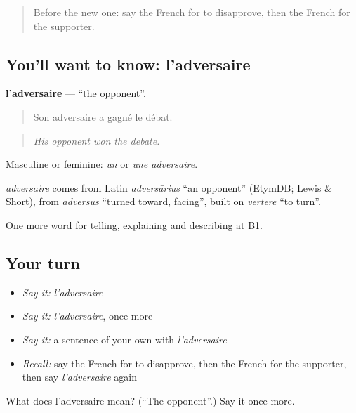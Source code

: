 \begin{quote}
Before the new one: say the French for to disapprove, then the French for the supporter.
\end{quote}

\subsection*{You'll want to know: l'adversaire}
\textbf{l'adversaire} — \textquotedblleft{}the opponent\textquotedblright{}.

\begin{quote}
Son adversaire a gagné le débat.
\end{quote}

\begin{quote}
\emph{His opponent won the debate.}
\end{quote}

Masculine or feminine: \emph{un} or \emph{une adversaire}.

\begin{cousinweb}
\emph{adversaire} comes from Latin \emph{adversārius} \textquotedblleft{}an opponent\textquotedblright{} (EtymDB; Lewis \& Short), from \emph{adversus} \textquotedblleft{}turned toward, facing\textquotedblright{}, built on \emph{vertere} \textquotedblleft{}to turn\textquotedblright{}.
\end{cousinweb}

\begin{grammarlens}[title={What you've built}]
One more word for telling, explaining and describing at B1.
\end{grammarlens}

\subsection*{Your turn}
\begin{itemize}
\raggedright
  \item \emph{Say it:} \emph{l'adversaire}
  \item \emph{Say it:} \emph{l'adversaire}, once more
  \item \emph{Say it:} a sentence of your own with \emph{l'adversaire}
  \item \emph{Recall:} say the French for to disapprove, then the French for the supporter, then say \emph{l'adversaire} again
\end{itemize}

\begin{tcolorbox}[breakable,colback=teal!4,colframe=teal!35!black,title={Before you move on}]
What does l'adversaire mean? (\textquotedblleft{}The opponent\textquotedblright{}.) Say it once more.
\end{tcolorbox}
